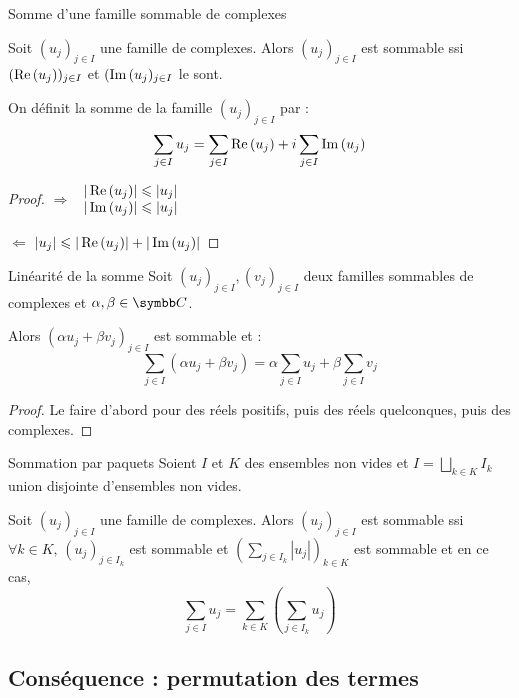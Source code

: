 \begin{theoreme}{Somme d'une famille sommable de complexes}{}

    Soit $(u_j)_{j \in I}$ une famille de complexes. Alors
    $(u_j)_{j\in I}$ est sommable ssi $(\operatorname{Re} \,(u_j))_{j\in I}$ et $(\operatorname{Im} \,(u_j)_{j\in I}$ le sont.

    On définit la somme de la famille $(u_j)_{j \in I}$ par :
    \[\sum_{j \in I} u_j = \sum_{j \in I} \operatorname{Re} \,(u_j) + i \sum_{j \in I} \operatorname{Im} \,(u_j)\]
\end{theoreme}


\begin{proof}{}{}
    $\Rightarrow$
    $\begin{array}{cc}
    |\operatorname{Re} \,(u_j)| \leqslant |u_j| \\
    |\operatorname{Im} \,(u_j)| \leqslant |u_j|
    \end{array}$

    $\Leftarrow$
    $|u_j|\leqslant |\operatorname{Re} \,(u_j)| + |\operatorname{Im} \,(u_j)|$
\end{proof}

\begin{proposition}{Linéarité de la somme}{}
    Soit $(u_j)_{j \in I}, (v_j)_{j \in I}$ deux familles sommables de complexes et $\alpha, \beta \in \C$.

    Alors $(\alpha u_j + \beta v_j)_{j \in I}$ est sommable et :
    \[\sum_{j \in I} (\alpha u_j + \beta v_j) = \alpha \sum_{j \in I} u_j + \beta \sum_{j \in I} v_j\]
\end{proposition}

\begin{proof}
    Le faire d'abord pour des réels positifs, puis des réels quelconques, puis des complexes.
\end{proof}

\begin{theoreme}{Sommation par paquets}{}
    Soient $I$ et $K$ des ensembles non vides et $\displaystyle I = \bigsqcup_{k \in K} I_k$ union
    disjointe d'ensembles non vides.

    Soit $(u_j)_{j \in I}$ une famille de complexes. Alors $(u_j)_{j \in I}$ est sommable ssi
    $\forall k \in K, \, (u_j)_{j \in I_k}$ est sommable et $\displaystyle \left( \sum_{j \in I_k} |u_j| \right)_{k \in K}$ est sommable
    et en ce cas, 
    \[\sum_{j \in I} u_j = \sum_{k \in K} \left( \sum_{j \in I_k} u_j \right)\]
\end{theoreme}

\subsection{Conséquence : permutation des termes}


